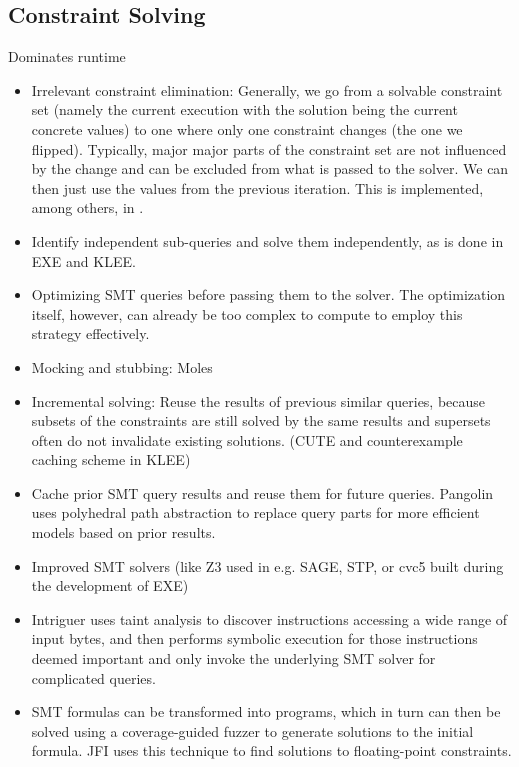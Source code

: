 \documentclass{article}
\begin{document}
\begin{multicols}{2}
    \subsection{Constraint Solving}
    \label{ConstraintSolving}
    Dominates runtime
    \begin{itemize}
        \item Irrelevant constraint elimination: Generally, we go from a solvable constraint set (namely the current execution with the solution being the current concrete values) to one where only one constraint changes (the one we flipped). Typically, major major parts of the constraint set are not influenced by the change and can be excluded from what is passed to the solver. We can then just use the values from the previous iteration. This is implemented, among others, in \cite{SAGE}.
        \item Identify independent sub-queries and solve them independently, as is done in EXE\cite{EXE} and KLEE\cite{KLEE}.
        \item Optimizing SMT queries before passing them to the solver. The optimization itself, however, can already be too complex to compute to employ this strategy effectively.
        \item Mocking and stubbing: Moles\cite{Moles}
        \item Incremental solving: Reuse the results of previous similar queries, because subsets of the constraints are still solved by the same results and supersets often do not invalidate existing solutions. (CUTE\cite{CUTE} and counterexample caching scheme in KLEE\cite{KLEE})
        \item Cache prior SMT query results and reuse them for future queries. Pangolin\cite{Pangolin} uses polyhedral path abstraction to replace query parts for more efficient models based on prior results.
        \item Improved SMT solvers (like Z3\cite{Z3} used in e.g. SAGE\cite{SAGE}, STP\cite{STP}, or cvc5\cite{CVC5} built during the development of EXE\cite{EXE})
        \item Intriguer\cite{Intriguer} uses taint analysis to discover instructions accessing a wide range of input bytes, and then performs symbolic execution for those instructions deemed important and only invoke the underlying SMT solver for complicated queries.
        \item SMT formulas can be transformed into programs, which in turn can then be solved using a coverage-guided fuzzer to generate solutions to the initial formula. JFI\cite{JFI} uses this technique to find solutions to floating-point constraints.

\end{itemize}
\end{multicols}
\end{document}
